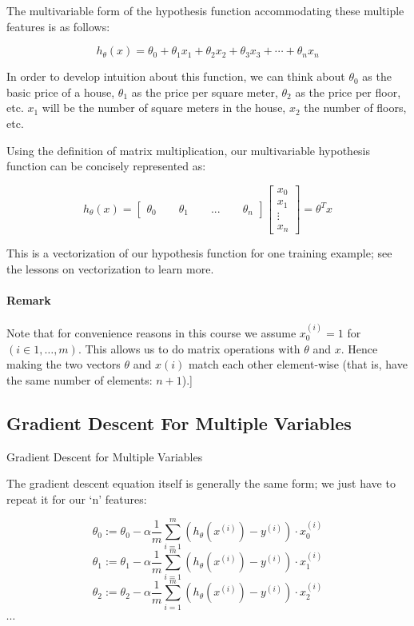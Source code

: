 \documentclass[UTF8]{article}
\begin{document}
The multivariable form of the hypothesis function accommodating these multiple features is as follows:

\[ h_\theta (x) = \theta_0 + \theta_1 x_1 + \theta_2 x_2 + \theta_3 x_3 + \cdots + \theta_n x_n \]

In order to develop intuition about this function, we can think about $\theta_0$ as the basic price of a house, $\theta_1$ as the price per square meter, $\theta_2$ as the price per floor, etc. $x_1$ will be the number of square meters in the house, $x_2$ the number of floors, etc.

Using the definition of matrix multiplication, our multivariable hypothesis function can be concisely represented as:

\[ h_\theta(x) = \begin{bmatrix}\theta_0 \hspace{2em} \theta_1 \hspace{2em} ... \hspace{2em} \theta_n\end{bmatrix}\begin{bmatrix}x_0 \\ x_1 \\ \vdots \\ x_n\end{bmatrix}= \theta^T x \]

This is a vectorization of our hypothesis function for one training example; see the lessons on vectorization to learn more.

\paragraph{Remark} Note that for convenience reasons in this course we assume $x_{0}^{(i)} =1$ for $(i\in { 1,\dots,m })$. This allows us to do matrix operations with $\theta$ and $x$. Hence making the two vectors $\theta$ and $x(i)$ match each other element-wise (that is, have the same number of elements: $n+1$).]

\subsection{Gradient Descent For Multiple Variables}

Gradient Descent for Multiple Variables

The gradient descent equation itself is generally the same form; we just have to repeat it for our `n' features:

\[ \theta_0 := \theta_0 - \alpha \frac{1}{m} \sum\limits_{i=1}^{m} (h_\theta(x^{(i)}) - y^{(i)}) \cdot x_0^{(i)} \]
\[ \theta_1 := \theta_1 - \alpha \frac{1}{m} \sum\limits_{i=1}^{m} (h_\theta(x^{(i)}) - y^{(i)}) \cdot x_1^{(i)} \]
\[ \theta_2 := \theta_2 - \alpha \frac{1}{m} \sum\limits_{i=1}^{m} (h_\theta(x^{(i)}) - y^{(i)}) \cdot x_2^{(i)} \]
$\cdots$
\end{document}
